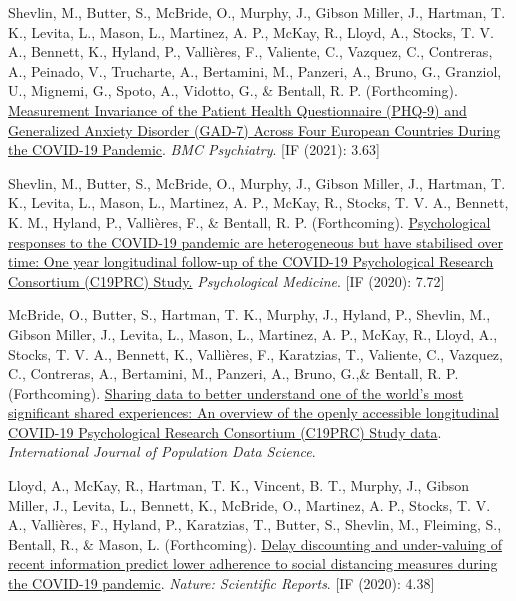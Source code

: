 \documentclass[12pt]{article}
\begin{document}
\begin{bibenum}
\item Shevlin, M., Butter, S., McBride, O., Murphy, J., Gibson Miller, J., Hartman, T. K., Levita, L., Mason, L., Martinez, A. P., McKay, R., Lloyd, A., Stocks, T. V. A., Bennett, K., Hyland, P., Vallières, F., Valiente, C., Vazquez, C., Contreras, A., Peinado, V., Trucharte, A., Bertamini, M., Panzeri, A., Bruno, G., Granziol, U., Mignemi, G., Spoto, A., Vidotto, G., \& Bentall, R. P. (Forthcoming). \href{https://psyarxiv.com/fwga8/}{Measurement Invariance of the Patient Health Questionnaire (PHQ-9) and Generalized Anxiety Disorder (GAD-7) Across Four European Countries During the COVID-19 Pandemic}. 
	\emph{BMC Psychiatry}. [IF (2021): 3.63]


	\item Shevlin, M., Butter, S., McBride, O., Murphy, J., Gibson Miller, J., Hartman, T. K.,
	Levita, L., Mason, L., Martinez, A. P.,  
	McKay, R., Stocks, T. V. A., Bennett, K. M.,  Hyland, P., Vallières, F., \& Bentall, R. P. (Forthcoming). 
		\href{https://psyarxiv.com/42dfu/}
		{Psychological responses to the COVID-19 pandemic are heterogeneous but have stabilised over time: 
		One year longitudinal follow-up of the COVID-19 Psychological Research Consortium (C19PRC) Study.}
		\emph{Psychological Medicine}. [IF (2020): 7.72]
		
\item McBride, O., Butter, S., Hartman, T. K., Murphy, J., Hyland, P., Shevlin, M., Gibson Miller, J.,  Levita, L., Mason, L., Martinez, A. P., McKay, R., Lloyd, A., Stocks, T. V. A., Bennett, K., Vallières, F., Karatzias, T., Valiente, C., Vazquez, C., Contreras, A., Bertamini, M., Panzeri, A., Bruno, G.,\& Bentall, R. P. (Forthcoming). \href{}{Sharing data to better understand one of the world’s most significant shared experiences: An overview of the openly accessible longitudinal COVID-19 Psychological Research Consortium (C19PRC) Study data}. 
	\emph{International Journal of Population Data Science}.

	\item Lloyd, A., McKay, R., Hartman, T. K., Vincent, B. T., Murphy, J., Gibson Miller, J., Levita, L., 
	Bennett, K., McBride, O.,  Martinez, A. P., Stocks, T. V. A., Vallières, F., Hyland, P., Karatzias, T., 
	Butter, S., Shevlin, M., Fleiming, S., Bentall, R., \& Mason, L.  (Forthcoming). 
		\href{https://psyarxiv.com/kvynr/}
		{Delay discounting and under-valuing of recent information predict lower adherence 
		to social distancing measures during the COVID-19 	pandemic}.
		\emph{Nature: Scientific Reports}. [IF (2020): 4.38]
		


\end{bibenum}
\end{document}
